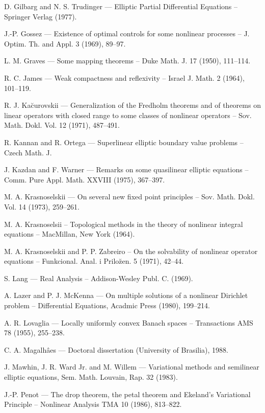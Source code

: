 \begin{thebibliography}{}
 D. Gilbarg and N. S. Trudinger --- Elliptic Partial
  Differential Equations -- Springer Verlag (1977).

 J.-P. Gossez --- Existence of optimal controls for
  some nonlinear processes -- J. Optim. Th. and Appl. 3 (1969), 89--97.

 L. M. Graves --- Some mapping theorems -- Duke
  Math. J. 17 (1950), 111--114.

 R. C. James --- Weak compactness and reflexivity --
  Israel J. Math. 2 (1964), 101--119.

 R. J. Ka\u{c}urovskii --- Generalization of the
  Fredholm theorems and of theorems on linear operators with closed
  range to some classes of nonlinear operators --
  Sov. Math. Dokl. Vol. 12 (1971), 487--491.

 R. Kannan and R. Ortega --- Superlinear elliptic
  boundary value problems -- Czech Math. J.

 J. Kazdan and F. Warner --- Remarks on some
  quasilinear elliptic equations -- Comm. Pure Appl. Math. XXVIII
  (1975), 367--397.

 M. A. Krasnoselskii --- On several new fixed point
  principles -- Sov. Math. Dokl. Vol. 14 (1973), 259--261.

 M. A. Krasnoselsii -- Topological methods in the
  theory of nonlinear integral equations -- MacMillan, New York (1964).

 M. A. Krasnoselskii and P. P. Zabreiro -- On the
  solvability of nonlinear operator equations -- Funkcional. Anal. i
  Prilo\u{z}en. 5 (1971), 42--44.

 S. Lang --- Real Analysis -- Addison-Wesley Publ. C. (1969).

 A. Lazer and P. J. McKenna --- On multiple solutions
  of a nonlinear Dirichlet problem -- Differential Equations, Acadmic
  Press (1980), 199--214.

 A. R. Lovaglia --- Locally uniformly convex Banach
  spaces -- Transactions AMS 78 (1955), 255--238.

 C. A. Magalh\^aes --- Doctoral dissertation
  (University of Brasilia), 1988.

 J. Mawhin, J. R. Ward Jr. and M. Willem ---
  Variational methods and semilinear elliptic equations,
  Sem. Math. Louvain, Rap. 32 (1983).

 J.-P. Penot --- The drop theorem, the petal theorem
  and Ekeland's Variational Principle -- Nonlinear Analysis TMA 10
  (1986), 813--822.


\end{thebibliography}
